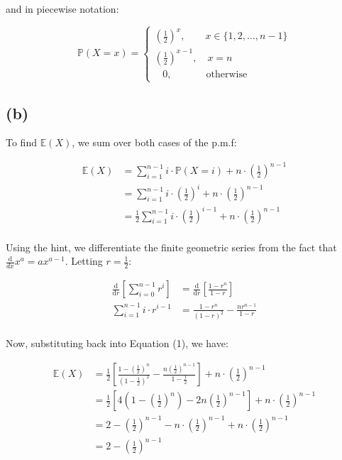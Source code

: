 \documentclass[12pt]{article}
\begin{document}
\noindent and in piecewise notation: 

\begin{equation*}
    \boxed{\mathbb{P}(X = x) = \begin{cases}
        \left(\displaystyle\frac{1}{2}\right)^{x}, \qquad x \in \{1, 2, \dots , n-1\} \\ 
        \left(\displaystyle\frac{1}{2}\right)^{x-1}, \quad x = n \\ 
        \; \; \; 0, \qquad \quad \; \, \text{otherwise}
    \end{cases}}
\end{equation*}

\newpage 
\subsection*{(b)}
To find $ \mathbb{E}(X)$, we sum over both cases of the p.m.f:

\begin{align}
    \mathbb{E}(X) &= \sum_{i=1}^{n-1} i \cdot \mathbb{P}(X = i) + n \cdot \left(\frac{1}{2}\right)^{n-1} \\ \nonumber
    &= \sum_{i=1}^{n-1} i \cdot \left(\frac{1}{2}\right)^{i} + n \cdot \left(\frac{1}{2}\right)^{n-1} \\ \nonumber
    &= \frac{1}{2 }\sum_{i=1}^{n-1} i \cdot \left(\frac{1}{2}\right)^{i-1} + n \cdot \left(\frac{1}{2}\right)^{n-1} \\ \nonumber
\end{align}

\noindent Using the hint, we differentiate the finite geometric series from the fact that $\frac{\text{d}}{dx} x^{a} = ax^{a-1}$. Letting $r = \frac{1}{2}$: 

\begin{align*}
    \frac{\text{d}}{\text{d}r} \left[\sum_{i=0}^{n-1} r^{i} \right] &= \frac{\text{d}}{\text{d}r} \left[\frac{1 - r^{n}}{1-r} \right]\\ 
    \sum_{i=1}^{n-1} i \cdot r ^{i-1} &= \frac{1-r^{n}}{(1-r)^{2}} - \frac{nr^{n-1}}{1-r} \\ 
\end{align*}

\noindent Now, substituting back into Equation (1), we have:

\begin{align*}
    \mathbb{E}(X) &= \frac{1}{2} \left[ \frac{1 - (\frac{1}{2})^{n}}{(1-\frac{1}{2})^{2}} - \frac{n(\frac{1}{2})^{n-1}}{1-\frac{1}{2}}\right] + n \cdot \left(\frac{1}{2}\right)^{n-1} \\ 
    &= \frac{1}{2} \left[4\left(1-\left(\frac{1}{2}\right)^{n}\right)-2n\left(\frac{1}{2}\right)^{n-1}\right] + n \cdot \left(\frac{1}{2}\right)^{n-1} \\
    &= 2- \left(\frac{1}{2}\right)^{n-1} - n\cdot\left(\frac{1}{2}\right)^{n-1} + n \cdot \left(\frac{1}{2}\right)^{n-1} \\
    &=  \boxed{2- \left(\frac{1}{2}\right)^{n-1}}
\end{align*}
\end{document}
